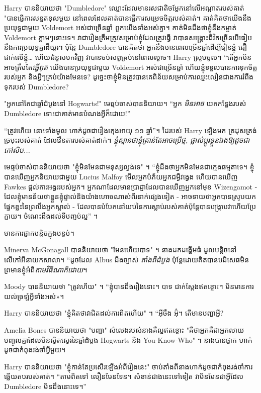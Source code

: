 Harry បាននិយាយថា "Dumbledore" ឈ្មោះដែលមានរសជាតិចម្លែកនៅលើអណ្តាតរបស់គាត់ "បានធ្វើការសន្មតខុសមួយ នៅពេលដែលគាត់បានធ្វើការសម្រេចចិត្តរបស់គាត់។ គាត់គិតថាយើងនឹងប្រយុទ្ធជាមួយ Voldemort អស់ជាច្រើនឆ្នាំ ពួកយើងទាំងអស់គ្នា។ គាត់មិនដឹងថាខ្ញុំនឹងកម្ចាត់ Voldemort ភ្លាមៗនោះទេ។ វា​ជា​រឿង​ត្រឹមត្រូវ​សម្រាប់​ខ្ញុំ​ដែល​ត្រូវ​ធ្វើ វា​បាន​សង្គ្រោះ​ជីវិត​ច្រើន​បើ​ធៀប​នឹង​ការ​ប្រយុទ្ធ​គ្នា​ដ៏​យូរ។ ប៉ុន្តែ Dumbledore បាន​គិត​ថា អ្នក​នឹង​មាន​ពេល​ច្រើន​ឆ្នាំ​ដើម្បី​រៀន​ខ្ញុំ ជឿជាក់​លើ​ខ្ញុំ… ហើយ​ជំនួស​មក​វិញ វា​បាន​ចប់​សព្វគ្រប់​នៅ​ពេល​ល្ងាច។ Harry ស្រូបចូល។ “តើអ្នកមិនអាចត្រឹមតែ\emph{ធ្វើពុត} យើងបានប្រយុទ្ធជាមួយ Voldemort អស់ជាច្រើនឆ្នាំ ហើយខ្ញុំទទួលបានការទុកចិត្តរបស់អ្នក និងអ្វីៗគ្រប់យ៉ាងមែនទេ? ដូច្នេះ​ថា​ខ្ញុំ​មិន​ត្រូវ​បាន​គេ​ពិន័យ​សម្រាប់​ការ​ឈ្នះ​លឿន​ជាង​ការ​រំពឹង​ទុក​របស់ Dumbledore?

"អ្នកនៅតែជាឆ្នាំដំបូងនៅ Hogwarts!" មេធ្មប់ចាស់បាននិយាយ។ “អ្នក \emph{មិនអាច} យកកន្លែងរបស់ Dumbledore ទោះជាគាត់មានបំណងអ្វីក៏ដោយ!”

“ត្រូវ​ហើយ នោះ​ទាំង​មូល ហាក់​ដូច​ជា​រឿង​ក្មេង​អាយុ ១១ ឆ្នាំ”។ ដៃរបស់ Harry ឡើងមក ត្រដុសត្រង់ច្រមុះរបស់គាត់ ដែលវ៉ែនតារបស់គាត់ដាក់។ \emph{ខ្ញុំ​ស្មាន​ថា​ខ្ញុំ​គ្រាន់​តែ​អាច​ប្រើ​ថ្ម, ផ្លាស់​ប្តូ​រ​ខ្លួន​ឯង​ឱ្យ​ដូច​ជា​កៅសិប...}

មេធ្មប់ចាស់បាននិយាយថា "ខ្ញុំមិនមែនជាមនុស្សល្ងង់ទេ" ។ “ខ្ញុំដឹងថាអ្នកមិនមែនជាក្មេងធម្មតាទេ។ ខ្ញុំបានឃើញអ្នកនិយាយជាមួយ Lucius Malfoy មើលអ្នកបំភ័យអ្នកជម្ងឺវង្វេង ហើយបានឃើញ Fawkes ផ្តល់ការអង្វររបស់អ្នក។ អ្នកណាដែលមានប្រាជ្ញាដែលបានឃើញអ្នកនៅមុខ Wizengamot - ដែលខ្ញុំមានន័យថាខ្លួនខ្ញុំផ្ទាល់និងយ៉ាងហោចណាស់ពីរនាក់ផ្សេងទៀត - អាចទាយថាអ្នកបានស្រូបយកផ្នែកខ្លះនៃព្រលឹងអ្នកស្គាល់ - ដែលបានបំបែកនៅយប់នៃការស្លាប់របស់គាត់ប៉ុន្តែបានបង្ក្រាបវាហើយប្រែក្លាយ។ ចំណេះដឹងដល់ទីបញ្ចប់ល្អ” ។

មាន​ការ​ផ្អាក​បន្តិច​ក្នុង​បន្ទប់។

Minerva McGonagall បាននិយាយថា "មែនហើយបាទ" ។ នាងដកដង្ហើមធំ ដួលបន្តិចនៅលើកៅអីនាយកសាលា។ “ដូចដែល Albus ដឹងច្បាស់ \emph{តាំងពីដំបូង} ប៉ុន្តែដោយគិតបានបដិសេធមិនព្រមានខ្ញុំអំពី\emph{តាមវិធីណាក៏ដោយ}។

Moody បាននិយាយថា "ត្រូវហើយ" ។ “ខ្ញុំបានដឹងរឿងនោះ។ បាទ ជាក់ស្តែងឥតខ្ចោះ។ មិន​មាន​ការ​យល់​ច្រឡំ​អ្វី​ទាំង​អស់»។

Harry បាននិយាយថា "ខ្ញុំគិតថាវាជិតដល់ការពិតហើយ" ។ “អ៊ីចឹង អ៊ុំ។ តើមានបញ្ហាអ្វី?

Amelia Bones បាននិយាយថា "បញ្ហា" សំលេងរបស់នាងគឺល្អឥតខ្ចោះ "គឺថាអ្នកគឺជាអ្នកលាយបញ្ចូលគ្នាដែលមិនស្ថិតស្ថេរនៃឆ្នាំដំបូង Hogwarts និង You-Know-Who" ។ នាងបានផ្អាក ហាក់ដូចជាកំពុងរង់ចាំអ្វីមួយ។

Harry បាននិយាយថា "ខ្ញុំកាន់តែប្រសើរឡើងអំពីរឿងនេះ" ចាប់តាំងពីនាងហាក់ដូចជាកំពុងរង់ចាំការឆ្លើយតបរបស់គាត់។ “តាមពិតទៅ លឿនមែនទែន។ សំខាន់ជាងនេះទៅទៀត វាមិនមែនជាអ្វីដែល Dumbledore មិនដឹងនោះទេ។”


